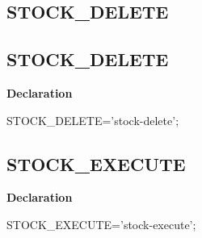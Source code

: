 \documentclass{report}
\newif\ifpdf
\begin{document}
\subsection*{\large{\textbf{STOCK{\_}DELETE}}\normalsize\hspace{1ex}\hrulefill}
\else
\subsection*{STOCK{\_}DELETE}
\fi
\label{licommon-STOCK_DELETE}
\begin{list}{}{
\setlength{\itemindent}{0cm}
\setlength{\listparindent}{0cm}
\setlength{\leftmargin}{\evensidemargin}
\addtolength{\leftmargin}{\tmplength}
\settowidth{\labelsep}{X}
\addtolength{\leftmargin}{\labelsep}
\setlength{\labelwidth}{\tmplength}
}
\item[\textbf{Declaration}\hfill]
\ifpdf
\begin{flushleft}
\fi
\begin{ttfamily}
STOCK{\_}DELETE='stock-delete';\end{ttfamily}

\ifpdf
\end{flushleft}
\fi

\end{list}
\ifpdf
\subsection*{\large{\textbf{STOCK{\_}EXECUTE}}\normalsize\hspace{1ex}\hrulefill}
\else
\subsection*{STOCK{\_}EXECUTE}
\fi
\label{licommon-STOCK_EXECUTE}
\begin{list}{}{
\setlength{\itemindent}{0cm}
\setlength{\listparindent}{0cm}
\setlength{\leftmargin}{\evensidemargin}
\addtolength{\leftmargin}{\tmplength}
\settowidth{\labelsep}{X}
\addtolength{\leftmargin}{\labelsep}
\setlength{\labelwidth}{\tmplength}
}
\item[\textbf{Declaration}\hfill]
\ifpdf
\begin{flushleft}
\fi
\begin{ttfamily}
STOCK{\_}EXECUTE='stock-execute';\end{ttfamily}

\ifpdf
\end{flushleft}
\fi

\end{list}
\ifpdf
\end{document}
